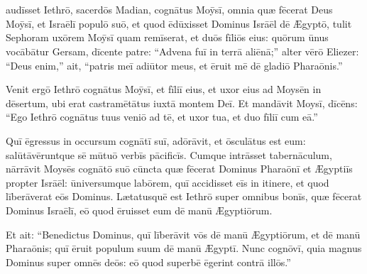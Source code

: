 \chapter{}


\thispagestyle{empty}

 audīsset Iethrō, sacerdōs Mad\-ian, cognātus Moȳsī,
omnia quæ fēcerat Deus Moȳsī, et Israēlī populō suō, et
quod ēdūxisset Dominus Isrāēl dē Ægyptō, 
tulit Sephoram
uxōrem Moȳsī quam remīserat, 
et duōs fīliōs eius: quōrum ūnus vocābātur
Gersam, dīcente patre: ``Advena fuī in terrā aliēnā;'' 
alter vērō Eliezer:
``Deus enim,'' ait, ``patris meī adiūtor
meus, et ēruit mē dē gladiō Pharaōnis.'' 

Venit ergō Iethrō
cognātus Moȳsī, et fīliī eius, et uxor eius ad Moysēn in
dēsertum, ubi erat castramētātus iuxtā
montem Deī. 
Et mandāvit Moysī, dīcēns: ``Ego Iethrō cognātus tuus veniō
ad tē, et uxor tua, et duo fīliī cum eā.'' 

Quī ēgressus in occursum
cognātī suī, adōrāvit, et ōsculātus est eum:
salūtāvēruntque sē mūtuō verbīs pācificīs. Cumque intrāsset
tabernāculum, 
nārrāvit Moysēs
cognātō suō cūncta quæ fēcerat Dominus
Pharaōnī et Ægyptiīs propter Isrāēl: ūniversumque labōrem,
quī accidisset eīs in itinere, et quod līberāverat eōs Dominus.
Lætatusquē est Iethrō super omnibus bonīs, quæ fēcerat Dominus Israēlī, eō
quod ēruisset eum dē manū Ægyptiōrum. 

Et ait: ``Benedictus Dominus, quī līberāvit vōs dē manū Ægyptiōrum, et dē manū
Pharaōnis; quī ēruit populum suum dē manū Ægyptī. 
Nunc cognōvī, quia
magnus Dominus super omnēs deōs: eō quod superbē ēgerint contrā illōs.''

